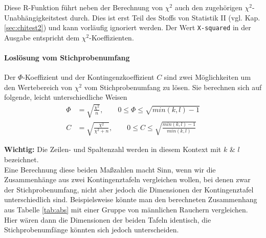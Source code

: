 \documentclass[a4paper]{article}
\newcommand\dangersign{%
 \makebox[1.8em][c]{%
 \makebox[0pt][c]{\raisebox{.15em}{\small!}}%
 \makebox[0pt][c]{\color{red}\Large$\triangle$}}}%
\begin{document}
\noindent {}

\noindent \dangersign Diese R-Funktion führt neben der Berechnung von $\chi^2$ auch den zugehörigen $\chi^2$-Unabhängigkeits\-test durch. Dies ist erst Teil des Stoffs von Statistik II (vgl. Kap. \ref{sec:chitest2}) und kann vorläufig ignoriert werden. Der Wert \texttt{X-squared} in der Ausgabe entspricht dem $\chi^2$-Koeffizienten.

\paragraph{Loslösung vom Stichprobenumfang}
Der $\Phi$-Koeffizient und der Kontingenzkoeffizient $C$ sind zwei Möglichkeiten um den Wertebereich von $\chi^2$ vom Stichprobenumfang zu lösen. Sie berechnen sich auf folgende, leicht unterschiedliche Weisen
\begin{align*}
    \Phi &= \sqrt{\frac{\chi^2}{n}}, \qquad 0 \leq \Phi \leq \sqrt{min(k,l)-1}\\
    C &= \sqrt{\frac{\chi^2}{\chi^2 + n}}, \qquad 0 \leq C \leq \sqrt{\frac{min(k,l)-1}{min(k,l)}}
\end{align*}

\noindent \dangersign \textbf{Wichtig:} Die Zeilen- und Spaltenzahl werden in diesem Kontext mit $k$ \& $l$ bezeichnet.\\

\noindent Eine Berechnung diese beiden Maßzahlen macht Sinn, wenn wir die Zusammenhänge aus zwei Kontingenztafeln vergleichen wollen, bei denen zwar der Stichprobenumfang, nicht aber jedoch die Dimensionen der Kontingenztafel unterschiedlich sind. Beispielsweise könnte man den berechneten Zusammenhang aus Tabelle \ref{tab:abs} mit einer Gruppe von männlichen Rauchern vergleichen. Hier wären dann die Dimensionen der beiden Tafeln identisch, die Stichprobenumfänge könnten sich jedoch unterscheiden.\\

\noindent {}\\
\noindent {}
\end{document}

